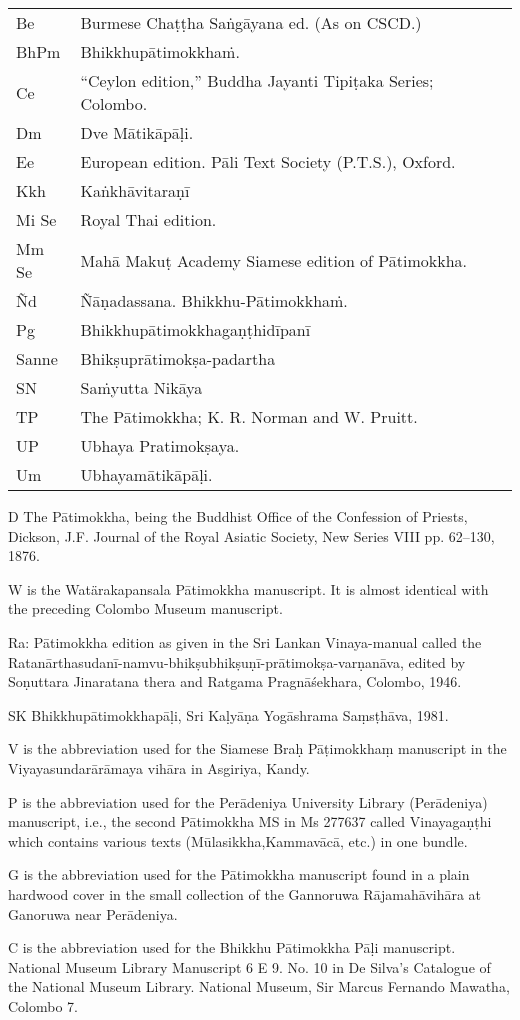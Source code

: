 \begin{tabular}{@{}llll@{}}
  Be & Burmese Chaṭṭha Saṅgāyana ed. (As on CSCD.)\\
  BhPm & Bhikkhupātimokkhaṁ.\\
  Ce & “Ceylon edition,” Buddha Jayanti Tipiṭaka Series; Colombo.\\
  Dm & Dve Mātikāpāḷi.\\
  Ee & European edition. Pāli Text Society (P.T.S.), Oxford.\\
  Kkh & Kaṅkhāvitaraṇī\\
  Mi Se & Royal Thai edition.\\
  Mm Se & Mahā Makuṭ Academy Siamese edition of Pātimokkha.\\
  Ñd & Ñāṇadassana. Bhikkhu-Pātimokkhaṁ.\\
  Pg & Bhikkhupātimokkhagaṇṭhidīpanī\\
  Sanne & Bhikṣuprātimokṣa-padartha\\
  SN    & Saṁyutta Nikāya\\
  TP & The Pātimokkha; K. R. Norman and W. Pruitt.\\
  UP & Ubhaya Pratimokṣaya.\\
  Um & Ubhayamātikāpāḷi.\\
\end{tabular}

\medskip

\fi

D The Pātimokkha, being the Buddhist Office of the Confession of Priests, Dickson, J.F. Journal of the Royal Asiatic Society, New Series VIII pp. 62–130, 1876.

W is the Watärakapansala Pātimokkha manuscript. It is almost identical with the preceding Colombo Museum manuscript.

Ra: Pātimokkha edition as given in the Sri Lankan Vinaya-manual called the Ratanārthasudanī-namvu-bhikṣubhikṣuṇī-prātimokṣa-varṇanāva, edited by Soṇuttara Jinaratana thera and Ratgama Pragnāśekhara, Colombo, 1946.

SK Bhikkhupātimokkhapāḷi, Sri Kaḷyāṇa Yogāshrama Saṃsṭhāva, 1981.

V is the abbreviation used for the Siamese Braḥ Pāṭimokkhaṃ manuscript in the Viyayasundarārāmaya vihāra in Asgiriya, Kandy.

P is the abbreviation used for the Perādeniya University Library (Perādeniya) manuscript, i.e., the second Pātimokkha MS in Ms 277637 called Vinayagaṇṭhi which contains various texts (Mūlasikkha,Kammavācā, etc.) in one bundle.

G is the abbreviation used for the Pātimokkha manuscript found in a plain hardwood cover in the small collection of the Gannoruwa Rājamahāvihāra at Ganoruwa near Perādeniya.

C is the abbreviation used for the Bhikkhu Pātimokkha Pāḷi manuscript. National Museum Library Manuscript 6 E 9. No. 10 in De Silva’s Catalogue of the National Museum Library. National
Museum, Sir Marcus Fernando Mawatha, Colombo 7.

